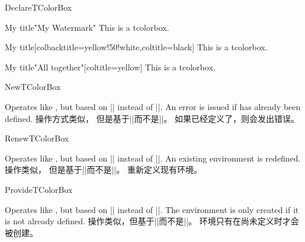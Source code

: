 \begin{docCommand}{DeclareTColorBox}{}
\begin{dispExample}
\begin{mybox}[green]{My title}"My Watermark"
This is a tcolorbox.
\end{mybox}

\begin{mybox}[yellow]{My title}[colbacktitle=yellow!50!white,coltitle=black]
This is a tcolorbox.
\end{mybox}

\begin{mybox}[purple]{My title}"All together"[coltitle=yellow]
This is a tcolorbox.
\end{mybox}
\end{dispExample}
\end{docCommand}

\begin{docCommand}{NewTColorBox}{}
\begin{stripedbox}
Operates like , 
but based on |\NewDocumentEnvironment| instead of |\DeclareDocumentEnvironment|.
An error is issued if  has already been defined.
\tcblower
操作方式类似，%
但是基于|\NewDocumentEnvironment|而不是|\DeclareDocumentEnvironment|。%
如果已经定义了，则会发出错误。
\end{stripedbox}
\end{docCommand}

\begin{docCommand}{RenewTColorBox}{}
\begin{stripedbox}
Operates like , but based on |\RenewDocumentEnvironment| instead of |\DeclareDocumentEnvironment|.
An existing environment is redefined.
\tcblower
操作类似，%
但是基于|\RenewDocumentEnvironment|而不是|\DeclareDocumentEnvironment|。%
重新定义现有环境。
\end{stripedbox}
\end{docCommand}

\begin{docCommand}{ProvideTColorBox}{}
\begin{stripedbox}
Operates like , but based on |\ProvideDocumentEnvironment| instead of |\DeclareDocumentEnvironment|.
The environment  is only created if it is not already defined.
\tcblower
操作类似，但基于|\ProvideDocumentEnvironment|而不是|\DeclareDocumentEnvironment|。
环境只有在尚未定义时才会被创建。
\end{stripedbox}
\end{docCommand}

